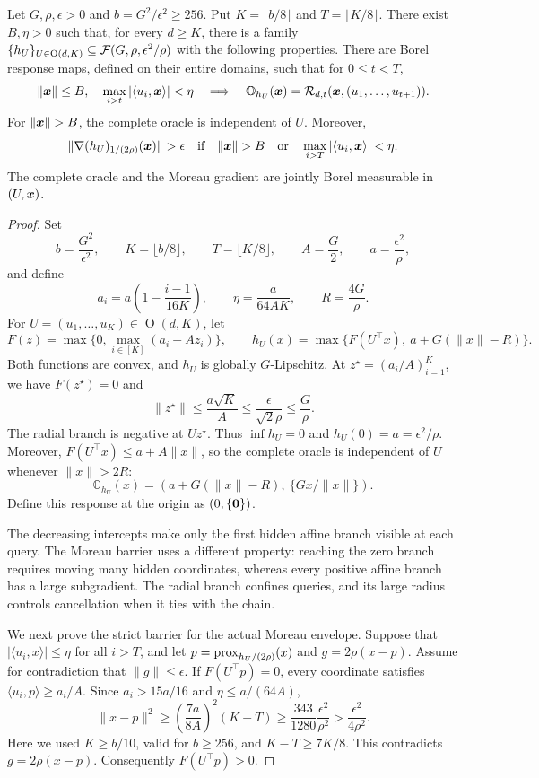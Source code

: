 \begin{appendix}
\begin{lemma}
\label{lem:principal-bridge}
Let $G,\rho,\epsilon>0$ and $b=G^2/\epsilon^2\ge256$.
Put $K=\lfloor b/8\rfloor$ and $T=\lfloor K/8\rfloor$.
There exist $B,\eta>0$ such that, for every $d\ge K$, there is a
family $\{h_U\}_{U\in\operatorname O(d,K)}
\subseteq{\cal F}(G,\rho,\epsilon^2/\rho)$ with the following properties.
There are Borel response maps, defined on their entire domains,
such that for $0\le t<T$,
\[
 \|\bm{x}\|\le B,\quad
 \max_{i>t}|\langle u_i,\bm{x}\rangle|<\eta
 \quad\Longrightarrow\quad
 \mathbb O_{h_U}(\bm{x})
 =\mathcal R_{d,t}(\bm{x},(u_1,\ldots,u_{t+1})).
\]
For $\|\x\|>B$, the complete oracle is independent of $U$.
Moreover,
\[
 \|\nabla(h_U)_{1/(2\rho)}(\x)\|>\epsilon
 \quad\text{if}\quad
 \|\x\|>B\quad\text{or}\quad
 \max_{i>T}|\langle u_i,\x\rangle|<\eta.
\]
The complete oracle and the Moreau gradient are jointly Borel
measurable in $(U,\bm{x})$.
\end{lemma}
\begin{proof}
Set
\[
 b=\frac{G^2}{\epsilon^2},\qquad
 K=\lfloor b/8\rfloor,\qquad T=\lfloor K/8\rfloor,\qquad
 A=\frac G2,\qquad a=\frac{\epsilon^2}{\rho},
\]
and define
\[
 a_i=a\left(1-\frac{i-1}{16K}\right),\qquad
 \eta=\frac{a}{64AK},\qquad R=\frac{4G}{\rho}.
\]
For $U=(u_1,\ldots,u_K)\in\operatorname O(d,K)$, let
\[
 F(z)=\max\{0,\max_{i\in[K]}(a_i-Az_i)\},
 \qquad
 h_U(x)=\max\{F(U^\top x),\ a+G(\|x\|-R)\}.
\]
Both functions are convex, and $h_U$ is globally $G$-Lipschitz.
At $z^\star=(a_i/A)_{i=1}^K$, we have $F(z^\star)=0$ and
\[
 \|z^\star\|\le\frac{a\sqrt K}{A}
 \le\frac{\epsilon}{\sqrt2\rho}\le\frac G\rho.
\]
The radial branch is negative at $Uz^\star$. Thus
$\inf h_U=0$ and $h_U(0)=a=\epsilon^2/\rho$.
Moreover, $F(U^\top x)\le a+A\|x\|$, so the complete oracle is
independent of $U$ whenever $\|x\|>2R$:
\[
\mathbb O_{h_U}(x)=
\left(a+G(\|x\|-R),\ \{Gx/\|x\|\}\right).
\]
Define this response at the origin as $(0,\{{\mathbf 0}\})$.

The decreasing intercepts make only the first hidden affine branch
visible at each query. The Moreau barrier uses a different property:
reaching the zero branch requires moving many hidden coordinates,
whereas every positive affine branch has a large subgradient.
The radial branch confines queries, and its large radius controls
cancellation when it ties with the chain.

We next prove the strict barrier for the actual Moreau envelope.
Suppose that
$|\langle u_i,x\rangle|\le\eta$ for all $i>T$, and let
$p=\operatorname{prox}_{h_U/(2\rho)}(x)$ and $g=2\rho(x-p)$.
Assume for contradiction that $\|g\|\le\epsilon$.
If $F(U^\top p)=0$, every coordinate satisfies
$\langle u_i,p\rangle\ge a_i/A$. Since $a_i>15a/16$ and
$\eta\le a/(64A)$,
\[
 \|x-p\|^2
 \ge\left(\frac{7a}{8A}\right)^2(K-T)
 \ge\frac{343}{1280}\frac{\epsilon^2}{\rho^2}
 >\frac{\epsilon^2}{4\rho^2}.
\]
Here we used $K\ge b/10$, valid for $b\ge256$, and
$K-T\ge7K/8$. This contradicts $g=2\rho(x-p)$.
Consequently $F(U^\top p)>0$.


\end{proof}
\end{appendix}
